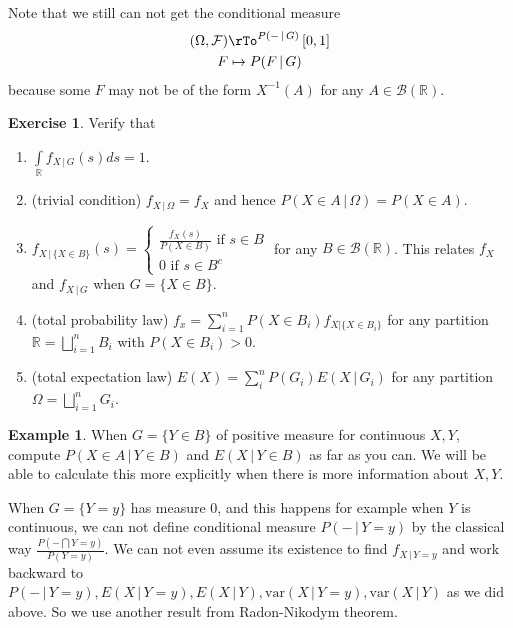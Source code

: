 \documentclass[12pt]{amsart}
\theoremstyle{definition}
\newtheorem{example}[theorem]{Example}
\newtheorem{exercise}[theorem]{Exercise}
\begin{document}
Note that we still can not get the conditional measure
\begin{align*}
(\Omega, \mathcal{F}) & \rTo^{P(- \,|\, G)} \, [0,1] \\
F & \mapsto P(F \,|\, G)
\end{align*}
because some $F$ may not be of the form $X^{-1}(A)$ for any $A \in \mathcal{B}(\mathbb{R})$.

\begin{exercise} Verify that
\begin{enumerate}[1.]
\item $\int\limits_{\mathbb{R}} f_{X \,|\, G}(s)ds = 1$.
\item (trivial condition) $f_{X \,|\, \Omega} = f_X$ and hence  $P(X \in A \,|\, \Omega) = P(X \in A)$.
\item $f_{X \,|\, \{X \in B\}}(s) = \begin{cases} \frac{f_X(s)}{P(X \in B)} \text{ if } s \in B \\ 0 \text{ if } s \in B^c \end{cases}$ for any $B \in \mathcal{B}(\mathbb{R})$. This relates $f_X$ and $f_{X \,|\, G}$ when $G = \{X \in B\}$.
\item (total probability law) $f_x = \sum\limits_{i = 1}^n P(X \in B_i) f_{X| \{X \in B_i\}}$ for any partition $\mathbb{R} = \bigsqcup\limits_{i=1}^n B_i$ with $P(X \in B_i) > 0$.
\item (total expectation law) $E(X) = \sum\limits_i^n P(G_i)E(X \,|\, G_i)$ for any partition $\Omega = \bigsqcup\limits_{i = 1}^n G_i$.
\end{enumerate}
\end{exercise}

\begin{example} When $G = \{Y \in B\}$ of positive measure for continuous $X, Y$, compute $P(X \in A \,|\, Y \in B)$ and $E(X \,|\, Y \in B)$ as far as you can. We will be able to calculate this more explicitly when there is more information about $X, Y$.
\end{example}

When $G = \{Y = y\}$ has measure $0$, and this happens for example when $Y$ is continuous, we can not define conditional measure $P( - \,|\, Y = y)$ by the classical way $\frac{P( - \bigcap Y = y)}{P(Y = y)}$. We can not even assume its existence to find $f_{X \,|\, Y = y}$ and work backward to $P(- \,|\, Y = y), E(X \,|\, Y = y), E(X \,|\, Y), \text{var}(X \,|\, Y = y), \text{var}(X \,|\, Y)$ as we did above. So we use another result from Radon-Nikodym theorem.
\end{document}

